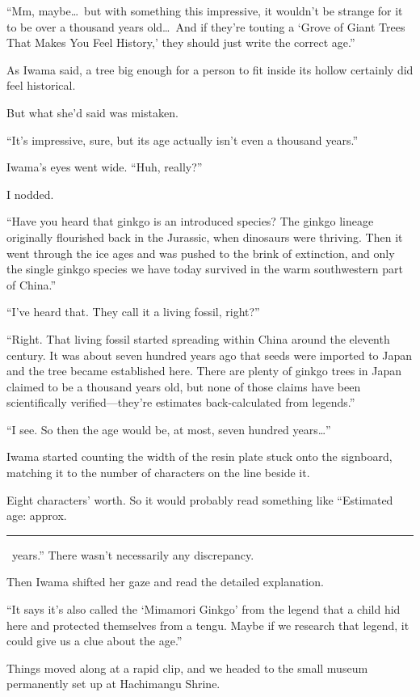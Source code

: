 \documentclass[
    a4paper,
    12pt,
    twoside,
    openany,
    UTF8,
    fontset=windows
]{ctexbook}
\begin{document}
``Mm, maybe\dots\ but with something this impressive, it wouldn't be strange for it to be over a thousand years old\dots\ And if they're touting a `Grove of Giant Trees That Makes You Feel History,' they should just write the correct age.''

As Iwama said, a tree big enough for a person to fit inside its hollow certainly did feel historical.

But what she'd said was mistaken.

``It's impressive, sure, but its age actually isn't even a thousand years.''

Iwama's eyes went wide. ``Huh, really?''

I nodded.

``Have you heard that ginkgo is an introduced species? The ginkgo lineage originally flourished back in the Jurassic, when dinosaurs were thriving. Then it went through the ice ages and was pushed to the brink of extinction, and only the single ginkgo species we have today survived in the warm southwestern part of China.''

``I've heard that. They call it a living fossil, right?''

``Right. That living fossil started spreading within China around the eleventh century. It was about seven hundred years ago that seeds were imported to Japan and the tree became established here. There are plenty of ginkgo trees in Japan claimed to be a thousand years old, but none of those claims have been scientifically verified---they're estimates back-calculated from legends.''

``I see. So then the age would be, at most, seven hundred years\dots''

Iwama started counting the width of the resin plate stuck onto the signboard, matching it to the number of characters on the line beside it.

Eight characters' worth. So it would probably read something like ``Estimated age: approx.\ \rule{1cm}{0.5pt}\ years.'' There wasn't necessarily any discrepancy.

Then Iwama shifted her gaze and read the detailed explanation.

``It says it's also called the `Mimamori Ginkgo' from the legend that a child hid here and protected themselves from a tengu. Maybe if we research that legend, it could give us a clue about the age.''

Things moved along at a rapid clip, and we headed to the small museum permanently set up at Hachimangu Shrine.
\end{document}

